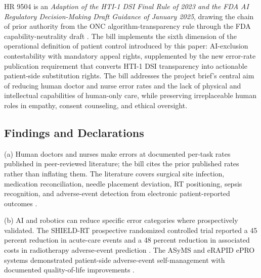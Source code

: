 
\hspace{0.5cm} HR 9504 is an \textit{Adaption of the HTI-1 DSI Final Rule of 2023
and the FDA AI Regulatory Decision-Making Draft Guidance of January
2025}, drawing the chain of prior authority from the ONC algorithm-transparency rule through the FDA capability-neutrality draft
\cite{rank9_onc_hti1_2023, hti1_dsi_fact_sheet_2023,
fda_ai_regulatory_decision_draft_2025}. The bill implements the
sixth dimension of the operational definition of patient control
introduced by this paper: AI-exclusion contestability with mandatory
appeal rights, supplemented by the new error-rate publication
requirement that converts HTI-1 DSI transparency into actionable
patient-side substitution rights. The bill addresses the project
brief's central aim of reducing human doctor and nurse error rates
and the lack of physical and intellectual capabilities of human-only
care, while preserving irreplaceable human roles in empathy, consent
counseling, and ethical oversight.

\subsection{Findings and Declarations}

\hspace{0.5cm} (a) Human doctors and nurses make errors at documented per-task
rates published in peer-reviewed literature; the bill cites the
prior published rates rather than inflating them. The literature
covers surgical site infection, medication reconciliation, needle
placement deviation, RT positioning, sepsis recognition, and
adverse-event detection from electronic patient-reported outcomes
\cite{rocque2025remote_symptom_monitoring}.

(b) AI and robotics can reduce specific error categories where
prospectively validated. The SHIELD-RT prospective randomized
controlled trial reported a 45 percent reduction in acute-care events
and a 48 percent reduction in associated costs in radiotherapy
adverse-event prediction
\cite{rocque2025remote_symptom_monitoring}. The ASyMS and eRAPID
ePRO systems demonstrated patient-side adverse-event self-management
with documented quality-of-life improvements
\cite{kearney2009asyms, maguire2017esmart, absolom2021erapid}.

